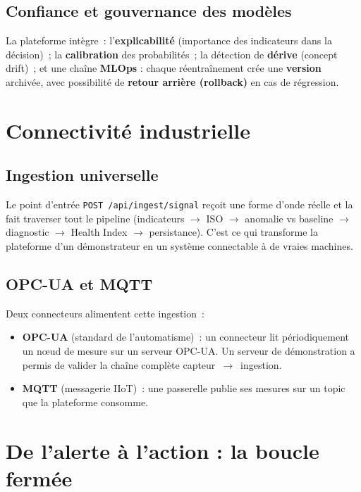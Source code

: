 \documentclass[12pt,a4paper]{article}
\begin{document}
\subsection{Confiance et gouvernance des modèles}
La plateforme intègre~: l'\textbf{explicabilité} (importance des indicateurs dans la
décision)~; la \textbf{calibration} des probabilités~; la détection de \textbf{dérive}
(concept drift)~; et une chaîne \textbf{MLOps} : chaque réentraînement crée une
\textbf{version} archivée, avec possibilité de \textbf{retour arrière (rollback)} en cas
de régression.

\section{Connectivité industrielle}

\subsection{Ingestion universelle}
Le point d'entrée \texttt{POST /api/ingest/signal} reçoit une forme d'onde réelle et la
fait traverser tout le pipeline (indicateurs $\rightarrow$ ISO $\rightarrow$ anomalie vs
baseline $\rightarrow$ diagnostic $\rightarrow$ Health Index $\rightarrow$ persistance).
C'est ce qui transforme la plateforme d'un démonstrateur en un système connectable à de
vraies machines.

\subsection{OPC-UA et MQTT}
Deux connecteurs alimentent cette ingestion~:
\begin{itemize}[leftmargin=1.4em]
  \item \textbf{OPC-UA} (standard de l'automatisme)~: un connecteur lit périodiquement un
        n\oe ud de mesure sur un serveur OPC-UA. Un serveur de démonstration a permis de
        valider la chaîne complète capteur~$\rightarrow$~ingestion.
  \item \textbf{MQTT} (messagerie IIoT)~: une passerelle publie ses mesures sur un topic
        que la plateforme consomme.
\end{itemize}

\section{De l'alerte à l'action : la boucle fermée}
\end{document}
